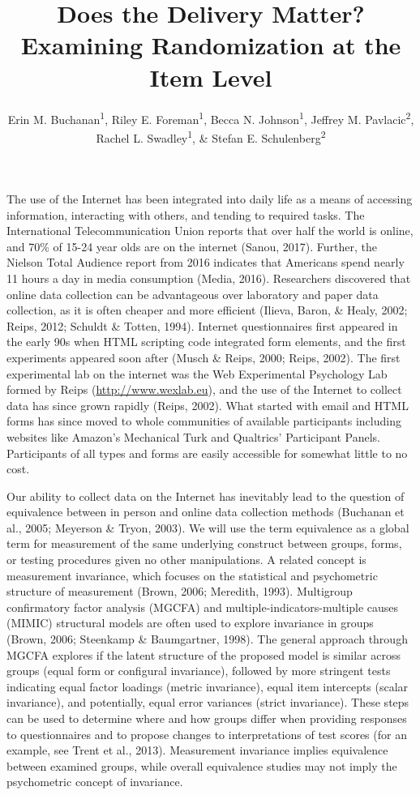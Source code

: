 \documentclass[english,man]{apa6}
\title{Does the Delivery Matter? Examining Randomization at the Item Level}
\author{Erin M. Buchanan\textsuperscript{1}, Riley E. Foreman\textsuperscript{1}, Becca N. Johnson\textsuperscript{1}, Jeffrey M. Pavlacic\textsuperscript{2}, Rachel L. Swadley\textsuperscript{1}, \& Stefan E. Schulenberg\textsuperscript{2}}
\affiliation{
    \vspace{0.5cm}
          \textsuperscript{1} Missouri State University\\
          \textsuperscript{2} University of Mississippi  }
\theoremstyle{definition}
\theoremstyle{definition}
\theoremstyle{definition}
\theoremstyle{remark}
\begin{document}
\maketitle

\setcounter{secnumdepth}{0}



The use of the Internet has been integrated into daily life as a means
of accessing information, interacting with others, and tending to
required tasks. The International Telecommunication Union reports that
over half the world is online, and 70\% of 15-24 year olds are on the
internet (Sanou, 2017). Further, the Nielson Total Audience report from
2016 indicates that Americans spend nearly 11 hours a day in media
consumption (Media, 2016). Researchers discovered that online data
collection can be advantageous over laboratory and paper data
collection, as it is often cheaper and more efficient (Ilieva, Baron, \&
Healy, 2002; Reips, 2012; Schuldt \& Totten, 1994). Internet
questionnaires first appeared in the early 90s when HTML scripting code
integrated form elements, and the first experiments appeared soon after
(Musch \& Reips, 2000; Reips, 2002). The first experimental lab on the
internet was the Web Experimental Psychology Lab formed by Reips
(\url{http://www.wexlab.eu}), and the use of the Internet to collect
data has since grown rapidly (Reips, 2002). What started with email and
HTML forms has since moved to whole communities of available
participants including websites like Amazon's Mechanical Turk and
Qualtrics' Participant Panels. Participants of all types and forms are
easily accessible for somewhat little to no cost.

Our ability to collect data on the Internet has inevitably lead to the
question of equivalence between in person and online data collection
methods (Buchanan et al., 2005; Meyerson \& Tryon, 2003). We will use
the term equivalence as a global term for measurement of the same
underlying construct between groups, forms, or testing procedures given
no other manipulations. A related concept is measurement invariance,
which focuses on the statistical and psychometric structure of
measurement (Brown, 2006; Meredith, 1993). Multigroup confirmatory
factor analysis (MGCFA) and multiple-indicators-multiple causes (MIMIC)
structural models are often used to explore invariance in groups (Brown,
2006; Steenkamp \& Baumgartner, 1998). The general approach through
MGCFA explores if the latent structure of the proposed model is similar
across groups (equal form or configural invariance), followed by more
stringent tests indicating equal factor loadings (metric invariance),
equal item intercepts (scalar invariance), and potentially, equal error
variances (strict invariance). These steps can be used to determine
where and how groups differ when providing responses to questionnaires
and to propose changes to interpretations of test scores (for an
example, see Trent et al., 2013). Measurement invariance implies
equivalence between examined groups, while overall equivalence studies
may not imply the psychometric concept of invariance.
\end{document}
